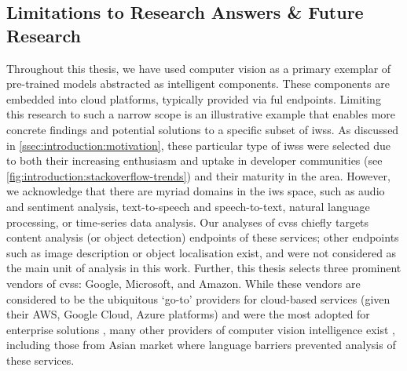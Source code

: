 \subsection{Limitations to Research Answers \& Future Research}

Throughout this thesis, we have used computer vision as a primary exemplar of pre-trained  models abstracted as intelligent  components. These components are embedded into cloud platforms, typically provided via ful  endpoints. Limiting this research to such a narrow scope is an illustrative example that enables more concrete findings and potential solutions to a specific subset of \glspl{iws}. As discussed in \cref{ssec:introduction:motivation}, these particular type of \glspl{iws} were selected due to both their increasing enthusiasm and uptake in developer communities (see \cref{fig:introduction:stackoverflow-trends}) and their maturity in the area. However, we acknowledge that there are myriad domains in the \gls{iws} space, such as audio and sentiment analysis, text-to-speech and speech-to-text, natural language processing, or time-series data analysis. Our analyses of \glspl{cvs} chiefly targets content analysis (or object detection) endpoints of these services; other endpoints such as image description or object localisation exist, and were not considered as the main unit of analysis in this work. Further, this thesis selects three prominent vendors of \glspl{cvs}: Google, Microsoft, and Amazon. While these vendors are considered to be the ubiquitous `go-to' providers for cloud-based services (given their AWS, Google Cloud, Azure platforms) and were the most adopted for enterprise solutions \citep{RightScaleInc:2018kJ}, many other providers of computer vision intelligence exist , including those from Asian market  where language barriers prevented analysis of these services.

